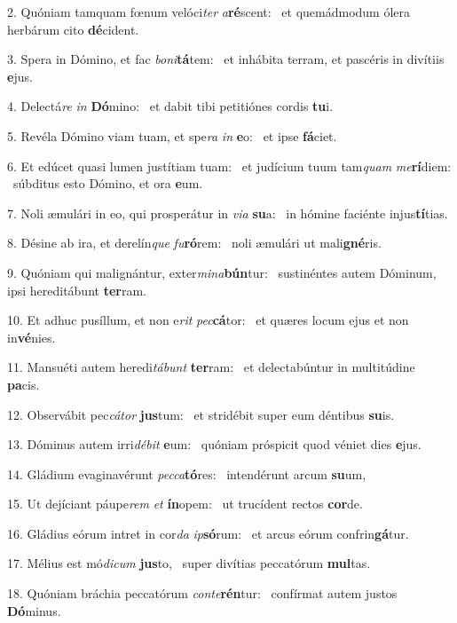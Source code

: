 2. Quóniam tamquam fœnum velóci\textit{ter} \textit{a}\textbf{ré}scent: \ast\  et quemádmodum ólera herbárum cito \textbf{dé}cident.\

3. Spera in Dómino, et fac \textit{bo}\textit{ni}\textbf{tá}tem: \ast\  et inhábita terram, et pascéris in divítiis \textbf{e}jus.\

4. Delectá\textit{re} \textit{in} \textbf{Dó}mino: \ast\  et dabit tibi petitiónes cordis \textbf{tu}i.\

5. Revéla Dómino viam tuam, et spe\textit{ra} \textit{in} \textbf{e}o: \ast\  et ipse \textbf{fá}ciet.\

6. Et edúcet quasi lumen justítiam tuam: \dag\  et judícium tuum tam\textit{quam} \textit{me}\textbf{rí}diem: \ast\  súbditus esto Dómino, et ora \textbf{e}um.\

7. Noli æmulári in eo, qui prosperátur in \textit{vi}\textit{a} \textbf{su}a: \ast\  in hómine faciénte injus\textbf{tí}tias.\

8. Désine ab ira, et derelín\textit{que} \textit{fu}\textbf{ró}rem: \ast\  noli æmulári ut mali\textbf{gné}ris.\

9. Quóniam qui malignántur, exter\textit{mi}\textit{na}\textbf{bún}tur: \ast\  sustinéntes autem Dóminum, ipsi hereditábunt \textbf{ter}ram.\

10. Et adhuc pusíllum, et non e\textit{rit} \textit{pec}\textbf{cá}tor: \ast\  et quæres locum ejus et non in\textbf{vé}nies.\

11. Mansuéti autem heredi\textit{tá}\textit{bunt} \textbf{ter}ram: \ast\  et delectabúntur in multitúdine \textbf{pa}cis.\

12. Observábit pec\textit{cá}\textit{tor} \textbf{jus}tum: \ast\  et stridébit super eum déntibus \textbf{su}is.\

13. Dóminus autem irri\textit{dé}\textit{bit} \textbf{e}um: \ast\  quóniam próspicit quod véniet dies \textbf{e}jus.\

14. Gládium evaginavérunt \textit{pec}\textit{ca}\textbf{tó}res: \ast\  intendérunt arcum \textbf{su}um,\

15. Ut dejíciant páupe\textit{rem} \textit{et} \textbf{ín}opem: \ast\  ut trucídent rectos \textbf{cor}de.\

16. Gládius eórum intret in cor\textit{da} \textit{ip}\textbf{só}rum: \ast\  et arcus eórum confrin\textbf{gá}tur.\

17. Mélius est mó\textit{di}\textit{cum} \textbf{jus}to, \ast\  super divítias peccatórum \textbf{mul}tas.\

18. Quóniam bráchia peccatórum \textit{con}\textit{te}\textbf{rén}tur: \ast\  confírmat autem justos \textbf{Dó}minus.\

